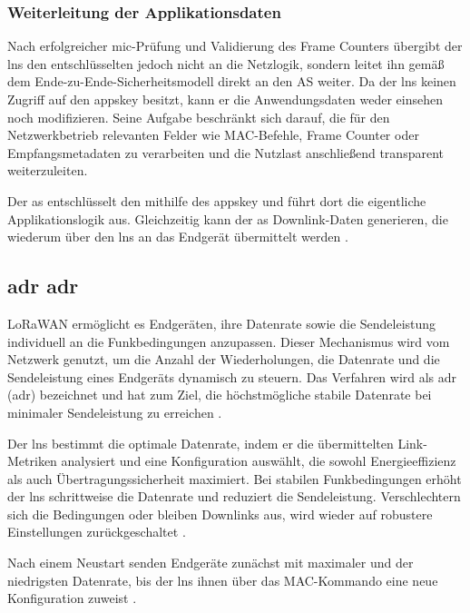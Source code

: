 \subsubsection{Weiterleitung der Applikationsdaten}
	Nach erfolgreicher \ac{mic}-Prüfung und Validierung des Frame Counters übergibt der \ac{lns} den entschlüsselten  jedoch nicht an die Netzlogik, sondern leitet ihn gemä{\ss} dem Ende-zu-Ende-Sicherheitsmodell direkt an den \ac{AS} weiter. Da der \ac{lns} keinen Zugriff auf den \ac{appskey} besitzt, kann er die Anwendungsdaten weder einsehen noch modifizieren. Seine Aufgabe beschränkt sich darauf, die für den Netzwerkbetrieb relevanten Felder wie MAC-Befehle, Frame Counter oder Empfangsmetadaten zu verarbeiten und die Nutzlast anschlie{\ss}end transparent weiterzuleiten.

	Der \ac{as} entschlüsselt den   mithilfe des \ac{appskey} und führt dort die eigentliche Applikationslogik aus. Gleichzeitig kann der \ac{as} Downlink-Daten generieren, die wiederum über den \ac{lns} an das Endgerät übermittelt werden  \cite{Montagny:2022} \cite{LoRaAlliance:2020b} \cite{LoRaAlliance:2020c}.


\subsection{\acl{adr} \acs{adr}}
	LoRaWAN ermöglicht es Endgeräten, ihre Datenrate sowie die Sendeleistung individuell an die Funkbedingungen anzupassen. Dieser Mechanismus wird vom Netzwerk genutzt, um die Anzahl der Wiederholungen, die Datenrate und die Sendeleistung eines Endgeräts dynamisch zu steuern. Das Verfahren wird als \acl{adr} (\acs{adr}) bezeichnet und hat zum Ziel, die höchstmögliche stabile Datenrate bei minimaler Sendeleistung zu erreichen \cite{LoRaAlliance:2020b, Montagny:2022}.
	
	Der \ac{lns} bestimmt die optimale Datenrate, indem er die übermittelten Link-Metriken analysiert und eine Konfiguration auswählt, die sowohl Energieeffizienz als auch Übertragungssicherheit maximiert. Bei stabilen Funkbedingungen erhöht der \ac{lns} schrittweise die Datenrate und reduziert die Sendeleistung. Verschlechtern sich die Bedingungen oder bleiben Downlinks aus, wird wieder auf robustere Einstellungen zurückgeschaltet \cite{Montagny:2022, LoRaAlliance:2020b}. 
	
	Nach einem Neustart senden Endgeräte zunächst mit maximaler  und der niedrigsten Datenrate, bis der \ac{lns} ihnen über das MAC-Kommando  eine neue Konfiguration zuweist \cite{LoRaAlliance:2020b}. 


